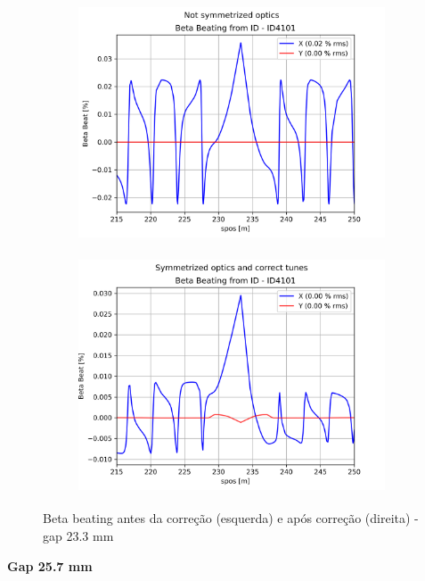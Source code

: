 \documentclass[a4paper,12pt]{article}
\begin{document}
\begin{figure}[H]
\begin{subfigure}{0.5\textwidth}
\includegraphics[width=0.9\linewidth, height=7cm]{figs/phase-16 gap23 uncorrected-optics.png} 
\label{fig:subim1-1623}
\end{subfigure}
\begin{subfigure}{0.5\textwidth}
\includegraphics[width=0.9\linewidth, height=7cm]{figs/phase-16 gap23 corrected-optics-tunes.png}
\label{fig:subim2-1623}
\end{subfigure}
\caption{Beta beating antes da correção (esquerda) e após correção (direita) - gap 23.3 mm}
\label{fig:bb-16_23}
\end{figure}

\textbf{Gap 25.7 mm} \\
\end{document}
